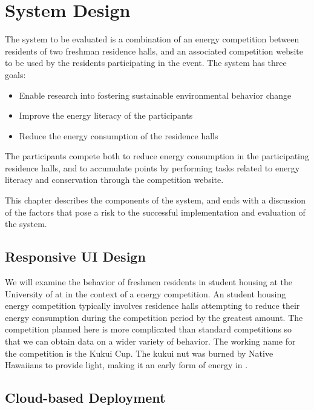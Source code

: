 \chapter{System Design}
\label{cha:system-description}

The system to be evaluated is a combination of an energy competition between residents of two freshman residence halls, and an associated competition website to be used by the residents participating in the event. The system has three goals:

\begin{itemize}
	\item Enable research into fostering sustainable environmental behavior change
	\item Improve the energy literacy of the participants
	\item Reduce the energy consumption of the residence halls
\end{itemize}

The participants compete both to reduce energy consumption in the participating residence halls, and to accumulate points by performing tasks related to energy literacy and conservation through the competition website.

This chapter describes the components of the system, and ends with a discussion of the factors that pose a risk to the successful implementation and evaluation of the system.

\section{Responsive UI Design}

We will examine the behavior of freshmen residents in student housing at the University of \Hawaii at \Manoa in the context of a energy competition. An student housing energy competition typically involves residence halls attempting to reduce their energy consumption during the competition period by the greatest amount. The competition planned here is more complicated than standard competitions so that we can obtain data on a wider variety of behavior. The working name for the competition is the Kukui Cup. The kukui nut was burned by Native Hawaiians to provide light, making it an early form of energy in \Hawaii.

\section{Cloud-based Deployment}

